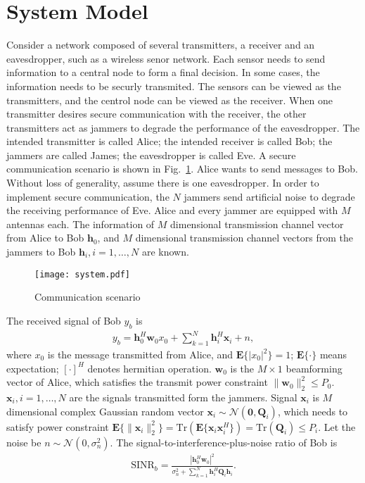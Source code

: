 \documentclass[12pt, journal,onecolumn,draftclsnofoot]{IEEEtran}
\begin{document}
\section{System Model} \label{sec:system model}
Consider a network composed of several transmitters, a receiver and an eavesdropper, such as a wireless senor network. Each sensor needs to send information to a central node to form a final decision. In some cases, the information needs to be securly transmited. The sensors can be viewed as the transmitters, and the centrol node can be viewed as the receiver. When one transmitter desires secure communication with the receiver, the other transmitters act as jammers to degrade the performance of the eavesdropper. The intended transmitter is called Alice; the intended receiver is called Bob; the jammers are called James; the eavesdropper is called Eve. A secure communication scenario is shown in Fig.~\ref{fig:system}. Alice wants to send messages to Bob. Without loss of generality, assume there is one eavesdropper. In order to implement secure communication, the $N$ jammers send artificial noise to degrade the receiving performance of Eve.  Alice and every jammer are equipped with $M$ antennas each. The information of $M$ dimensional transmission channel vector from Alice to Bob $\mathbf{h}_0$, and $M$ dimensional transmission channel vectors from the jammers to Bob $\mathbf{h}_i, i = 1,\ldots,N$ are known.
\begin{figure}[!htbp]
	\centering
	\texttt{[image: system.pdf]} %
	\caption{Communication scenario}
	\label{fig:system}
\end{figure}
The received signal of Bob $y_b$ is
\begin{eqnarray}
y_b =\mathbf{h}_0^{H}\mathbf{w}_0x_0 + \sum_{k=1}^N \mathbf{h}_{i}^H\mathbf{x}_{i} + n,
\end{eqnarray}
where $x_0$ is the message transmitted from Alice, and $\mathbf{E}\{|x_0|^2\} = 1$; $\mathbf{E}\{\cdot\}$ means expectation; $[\cdot]^H$ denotes hermitian operation. $\mathbf{w}_{0}$  is the $M \times 1$ beamforming vector of Alice, which satisfies the transmit power constraint $\|\mathbf{w}_0\|_2^2 \leq P_0$. $\mathbf{x}_i, i = 1,\ldots,N $ are the signals transmitted form the jammers. Signal $\mathbf{x}_i$ is $M$ dimensional  complex Gaussian random vector $\mathbf{x}_i \sim \mathcal{N}(\mathbf{0}, \mathbf{Q}_i)$, which needs to satisfy power constraint $\mathbf{E}\{\|\mathbf{x}_i\|_2^2\}  = \mathrm{Tr}(\mathbf{E}\{\mathbf{x}_i\mathbf{x}_i^H\} )= \mathrm{Tr}(\mathbf{Q}_i) \leq P_i$. Let the noise be $n \sim \mathcal{N}(0,\sigma_n^2)$. The signal-to-interference-plus-noise ratio of Bob is
\begin{eqnarray}
\mathrm{SINR}_b = \frac{\left| \mathbf{h}_{0}^H\mathbf{w}_{0}\right|^2}{\sigma_n^2 + \sum_{k=1}^{N}\mathbf{h}_{i}^H\mathbf{Q}_{i}\mathbf{h}_i}.
\end{eqnarray}
\end{document}
